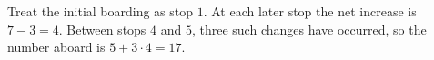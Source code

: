 Treat the initial boarding as stop $1$. At each later stop the net increase is $7-3=4$. Between stops $4$ and $5$, three such changes have occurred, so the number aboard is $5+3\cdot4=\boxed{17}$.
